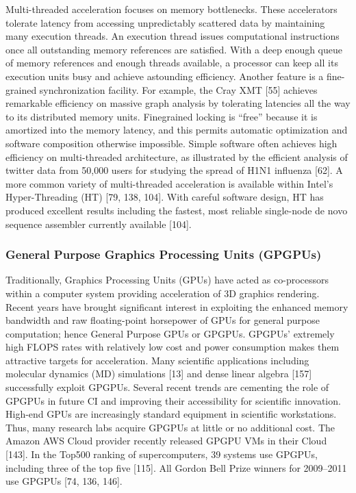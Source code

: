 Multi-threaded acceleration focuses on memory bottlenecks. These accelerators tolerate latency
from accessing unpredictably scattered data by maintaining many execution threads. An execution
thread issues computational instructions once all outstanding memory references are satisfied. With
a deep enough queue of memory references and enough threads available, a processor can keep
all its execution units busy and achieve astounding efficiency. Another feature is a fine-grained
synchronization facility. For example, the Cray XMT [55] achieves remarkable efficiency on
massive graph analysis by tolerating latencies all the way to its distributed memory units. Finegrained
locking is “free” because it is amortized into the memory latency, and this permits automatic
optimization and software composition otherwise impossible. Simple software often achieves high
efficiency on multi-threaded architecture, as illustrated by the efficient analysis of twitter data
from 50,000 users for studying the spread of H1N1 influenza [62]. A more common variety of
multi-threaded acceleration is available within Intel’s Hyper-Threading (HT) [79, 138, 104]. With
careful software design, HT has produced excellent results including the fastest, most reliable
single-node de novo sequence assembler currently available [104].

\subsubsection{General Purpose Graphics Processing Units (GPGPUs)}
Traditionally, Graphics Processing Units (GPUs) have acted as co-processors within a computer
system providing acceleration of 3D graphics rendering. Recent years have brought significant
interest in exploiting the enhanced memory bandwidth and raw floating-point horsepower of GPUs
for general purpose computation; hence General Purpose GPUs or GPGPUs. GPGPUs’ extremely
high FLOPS rates with relatively low cost and power consumption makes them attractive targets for
acceleration. Many scientific applications including molecular dynamics (MD) simulations [13] and
dense linear algebra [157] successfully exploit GPGPUs. Several recent trends are cementing the
role of GPGPUs in future CI and improving their accessibility for scientific innovation. High-end GPUs are increasingly standard equipment in scientific workstations. Thus, many research labs
acquire GPGPUs at little or no additional cost. The Amazon AWS Cloud provider recently released
GPGPU VMs in their Cloud [143]. In the Top500 ranking of supercomputers, 39 systems use
GPGPUs, including three of the top five [115]. All Gordon Bell Prize winners for 2009–2011 use
GPGPUs [74, 136, 146].

